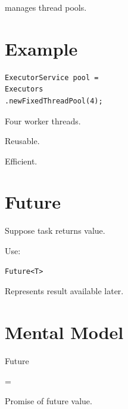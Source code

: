 \documentclass[11pt,a4paper]{book}
\begin{document}

manages thread pools.


\section{Example}

\begin{verbatim} 
ExecutorService pool =
Executors
.newFixedThreadPool(4);
\end{verbatim}


Four worker threads.


Reusable.


Efficient.


\section{Future}

Suppose task returns value.


Use:

\begin{verbatim} 
Future<T>
\end{verbatim}


Represents result available
later.


\section{Mental Model}

Future

=

Promise of future value.

\end{document}
